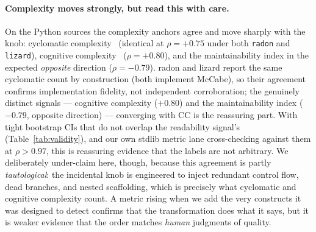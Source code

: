 \paragraph{Complexity moves strongly, but read this with care.}
On the Python sources the complexity anchors agree and move sharply with the knob:
cyclomatic complexity~\citep{mccabe1976complexity} (identical at $\rho=+0.75$ under both
\texttt{radon} and \texttt{lizard}), cognitive complexity~\citep{campbell2018cognitive}
($\rho=+0.80$), and the maintainability index in
the expected \emph{opposite} direction ($\rho=-0.79$). radon and lizard report the same
cyclomatic count by construction (both implement McCabe), so their agreement confirms
implementation fidelity, not independent corroboration; the genuinely distinct signals
--- cognitive complexity ($+0.80$) and the maintainability index ($-0.79$, opposite
direction) --- converging with CC is the reassuring part. With tight bootstrap CIs that do
not overlap the readability signal's (Table~\ref{tab:validity}), and our own stdlib metric
lane cross-checking against them at $\rho>0.97$, this is reassuring evidence that the
labels are not arbitrary. We
deliberately under-claim here, though, because this agreement is partly
\emph{tautological}: the incidental knob is engineered to inject redundant control flow,
dead branches, and nested scaffolding, which is precisely what cyclomatic and cognitive
complexity count. A metric rising when we add the very constructs it was designed to
detect confirms that the transformation does what it says, but it is weaker evidence that
the order matches \emph{human} judgments of quality.

